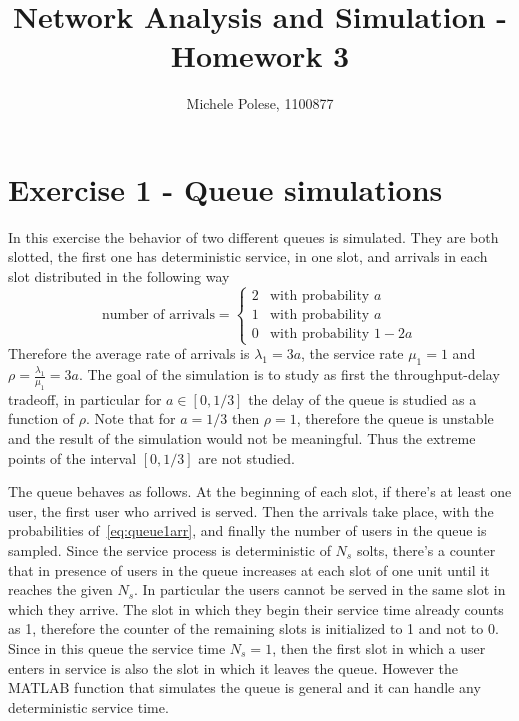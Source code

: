 \documentclass[10pt]{article}
\begin{document}
\title{Network Analysis and Simulation - Homework 3}
\author{Michele Polese, 1100877}

\maketitle

\section*{Exercise 1 - Queue simulations}
In this exercise the behavior of two different queues is simulated. They are both slotted, the first one has deterministic service, in one slot, and arrivals in each slot distributed in the following way
\begin{equation}
  \mbox{number of arrivals} = 
  \begin{cases}
    2 & \mbox{with probability } a\\
    1 & \mbox{with probability } a\\
    0 & \mbox{with probability } 1-2a
  \end{cases}
  \label{eq:queue1arr}
\end{equation}
Therefore the average rate of arrivals is $\lambda_1 = 3a$, the service rate $\mu_1 = 1$ and $\rho = \frac{\lambda_1}{\mu_1} = 3a$. 
The goal of the simulation is to study as first the throughput-delay tradeoff, in particular for $a \in [0, 1/3]$ the delay of the queue is studied as a function of $\rho$. Note that for $a = 1/3$ then $\rho = 1$, therefore the queue is unstable and the result of the simulation would not be meaningful. Thus the extreme points of the interval $[0, 1/3]$ are not studied. 

The queue behaves as follows. At the beginning of each slot, if there's at least one user, the first user who arrived is served. Then the arrivals take place, with the probabilities of~\eqref{eq:queue1arr}, and finally the number of users in the queue is sampled. Since the service process is deterministic of $N_s$ solts, there's a counter that in presence of users in the queue increases at each slot of one unit until it reaches the given $N_s$. In particular the users cannot be served in the same slot in which they arrive. The slot in which they begin their service time already counts as 1, therefore the counter of the remaining slots is initialized to 1 and not to 0. Since in this queue the service time $N_s = 1$, then the first slot in which a user enters in service is also the slot in which it leaves the queue. However the MATLAB function that simulates the queue is general and it can handle any deterministic service time. 
\end{document}
